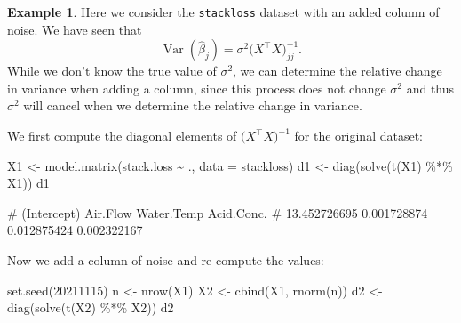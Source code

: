 \documentclass[
  a4paper,
]{article}
\newenvironment{Shaded}{\begin{snugshade}}{\end{snugshade}}
\newcommand{\AttributeTok}[1]{\textcolor[rgb]{0.77,0.63,0.00}{#1}}
\newcommand{\DecValTok}[1]{\textcolor[rgb]{0.00,0.00,0.81}{#1}}
\newcommand{\FunctionTok}[1]{\textcolor[rgb]{0.00,0.00,0.00}{#1}}
\newcommand{\NormalTok}[1]{#1}
\newcommand{\OtherTok}[1]{\textcolor[rgb]{0.56,0.35,0.01}{#1}}
\newcommand{\SpecialCharTok}[1]{\textcolor[rgb]{0.00,0.00,0.00}{#1}}
\theoremstyle{definition}
\theoremstyle{definition}
\newtheorem{example}{Example}[section]
\theoremstyle{definition}
\theoremstyle{definition}
\theoremstyle{remark}
\begin{document}
\begin{example}
Here we consider the \texttt{stackloss} dataset with an added column of
noise. We have seen that
\begin{equation*}
  \mathop{\mathrm{Var}}( \hat\beta_j )
  = \sigma^2 \bigl( X^\top X \bigr)^{-1}_{jj}.
\end{equation*}
While we don't know the true value of \(\sigma^2\), we can determine
the relative change in variance when adding a column, since this process
does not change \(\sigma^2\) and thus \(\sigma^2\) will cancel when we
determine the relative change in variance.

We first compute the diagonal elements of \(\bigl( X^\top X \bigr)^{-1}\)
for the original dataset:

\begin{Shaded}
\begin{Highlighting}[]
\NormalTok{X1 }\OtherTok{\textless{}{-}} \FunctionTok{model.matrix}\NormalTok{(stack.loss }\SpecialCharTok{\textasciitilde{}}\NormalTok{ ., }\AttributeTok{data =}\NormalTok{ stackloss)}
\NormalTok{d1 }\OtherTok{\textless{}{-}} \FunctionTok{diag}\NormalTok{(}\FunctionTok{solve}\NormalTok{(}\FunctionTok{t}\NormalTok{(X1) }\SpecialCharTok{\%*\%}\NormalTok{ X1))}
\NormalTok{d1}
\end{Highlighting}
\end{Shaded}

\begin{Shaded}
\begin{Highlighting}[]
\NormalTok{\#  (Intercept)     Air.Flow   Water.Temp   Acid.Conc. }
\NormalTok{\# 13.452726695  0.001728874  0.012875424  0.002322167}
\end{Highlighting}
\end{Shaded}

Now we add a column of noise and re-compute the values:

\begin{Shaded}
\begin{Highlighting}[]
\FunctionTok{set.seed}\NormalTok{(}\DecValTok{20211115}\NormalTok{)}
\NormalTok{n }\OtherTok{\textless{}{-}} \FunctionTok{nrow}\NormalTok{(X1)}
\NormalTok{X2 }\OtherTok{\textless{}{-}} \FunctionTok{cbind}\NormalTok{(X1, }\FunctionTok{rnorm}\NormalTok{(n))}
\NormalTok{d2 }\OtherTok{\textless{}{-}} \FunctionTok{diag}\NormalTok{(}\FunctionTok{solve}\NormalTok{(}\FunctionTok{t}\NormalTok{(X2) }\SpecialCharTok{\%*\%}\NormalTok{ X2))}
\NormalTok{d2}
\end{Highlighting}
\end{Shaded}


\end{example}
\end{document}
